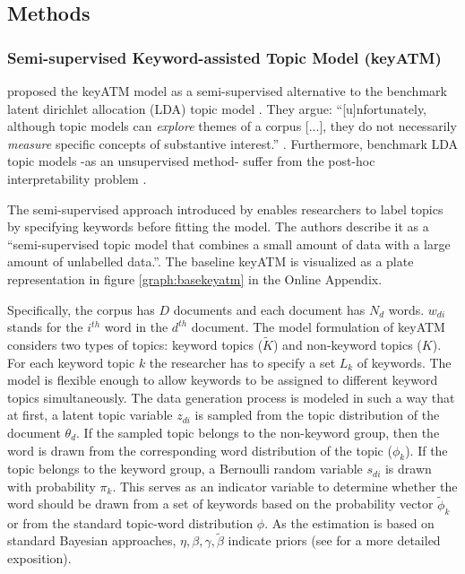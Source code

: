 
\subsection{Methods}\label{subsec:methods}

\subsubsection{Semi-supervised Keyword-assisted Topic Model (\textsf{\textbf{keyATM}})}

\cite{Eshima.2023} proposed the \textsf{keyATM} model as a semi-supervised alternative to the benchmark latent dirichlet allocation (LDA) topic model \citep{blei.2003}. They argue: ``[u]nfortunately, although topic models can \textit{explore} themes of a corpus [...], they do not necessarily \textit{measure} specific concepts of substantive interest.'' \citep[1]{Eshima.2023}. Furthermore, benchmark LDA topic models -as an unsupervised method- suffer from the post-hoc interpretability problem \citep{BoydGraber.etal.2014}.

The semi-supervised approach introduced by \cite{Eshima.2023} enables researchers to label topics by specifying keywords before fitting the model. The authors describe it as a ``semi-supervised topic model that combines a small amount of data with a large amount of unlabelled data.''\citep[2]{Eshima.2023}. The baseline \textsf{keyATM} is visualized as a plate representation in figure \ref{graph:basekeyatm} in the Online Appendix. %

Specifically, the corpus has $D$ documents and each document has $N_d$ words. $w_{di}$ stands for the $i^{th}$ word in the $d^{th}$ document. The model formulation of \textsf{keyATM} considers two types of topics: keyword topics ($\tilde{K}$) and non-keyword topics ($K$). For each keyword topic $k$ the researcher has to specify a set $L_k$ of keywords. The model is flexible enough to allow keywords to be assigned to different keyword topics simultaneously. The data generation process is modeled in such a way that at first, a latent topic variable $z_{di}$ is sampled from the topic distribution of the document $\theta_d$. If the sampled topic belongs to the non-keyword group, then the word is drawn from the corresponding word distribution of the topic ($\phi_k$). If the topic belongs to the keyword group, a Bernoulli random variable $s_{di}$ is drawn with probability $\pi_k$. This serves as an indicator variable to determine whether the word should be drawn from a set of keywords based on the probability vector $\tilde{\phi}_{k}$ or from the standard topic-word distribution $\phi$. As the estimation is based on standard Bayesian approaches, $\eta, \beta, \gamma, \tilde{\beta}$ indicate priors (see \citet[4 f.]{Eshima.2023} for a more detailed exposition).

